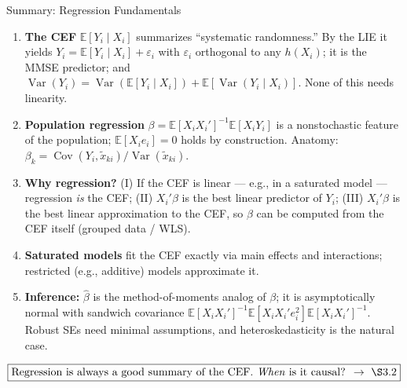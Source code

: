 \documentclass[aspectratio=169,11pt]{beamer}
\newcommand{\E}{\mathbb{E}}
\newcommand{\Var}{\operatorname{Var}}
\newcommand{\Cov}{\operatorname{Cov}}
\newcommand{\Sec}{\ensuremath{\S}}
\begin{document}
\begin{frame}{Summary: Regression Fundamentals}
\small

\begin{enumerate}
    \item \textbf{The CEF} $\E[Y_i\mid X_i]$ summarizes ``systematic
    randomness.'' By the LIE it yields
    $Y_i=\E[Y_i\mid X_i]+\varepsilon_i$ with $\varepsilon_i$ orthogonal to any
    $h(X_i)$; it is the MMSE predictor; and
    $\Var(Y_i)=\Var(\E[Y_i\mid X_i])+\E[\Var(Y_i\mid X_i)]$. None of this
    needs linearity.
    \item \textbf{Population regression}
    $\beta=\E[X_iX_i']^{-1}\E[X_iY_i]$ is a nonstochastic feature of the
    population; $\E[X_ie_i]=0$ holds by construction. Anatomy:
    $\beta_k=\Cov(Y_i,\tilde x_{ki})/\Var(\tilde x_{ki})$.
    \item \textbf{Why regression?} (I) If the CEF is linear --- e.g., in a
    saturated model --- regression \emph{is} the CEF; (II) $X_i'\beta$ is the
    best linear predictor of $Y_i$; (III) $X_i'\beta$ is the best linear
    approximation to the CEF, so $\beta$ can be computed from the CEF itself
    (grouped data / WLS).
    \item \textbf{Saturated models} fit the CEF exactly via main effects and
    interactions; restricted (e.g., additive) models approximate it.
    \item \textbf{Inference:} $\hat\beta$ is the method-of-moments analog of
    $\beta$; it is asymptotically normal with sandwich covariance
    $\E[X_iX_i']^{-1}\E[X_iX_i'e_i^2]\E[X_iX_i']^{-1}$. Robust SEs need
    minimal assumptions, and heteroskedasticity is the natural case.
\end{enumerate}

\medskip

\[
\boxed{
\text{Regression is always a good summary of the CEF.
\emph{When} is it causal? \;$\rightarrow$\; \Sec{}3.2}
}
\]

\end{frame}
\end{document}
